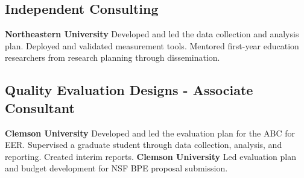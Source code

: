 
\subsection{Independent Consulting}
\begin{cvtable}
        {\color{cvsectioncolor}{Entrepreneurial Mindset and Cultural Wealth in Engineering \\(EM-FYE)}}
        {\textbf{Northeastern University}}
        {Developed and led the data collection and analysis plan. Deployed and validated measurement tools. Mentored first-year education researchers from research planning through dissemination.}
\end{cvtable}

\subsection{Quality Evaluation Designs - Associate Consultant}
\begin{cvtable}
        {\color{cvsectioncolor}{Advocacy Building Campaign for Engineering Education Research \\(ABC for EER)}}
        {\textbf{Clemson University}}
        {Developed and led the evaluation plan for the ABC for EER. Supervised a graduate student through data collection, analysis, and reporting. Created interim reports.}
        {\color{cvsectioncolor}{Peer Review as an Inclusive Mentoring Experience \\(PRIME)}}
        {\textbf{Clemson University}}
        {Led evaluation plan and budget development for NSF BPE proposal submission.}
\end{cvtable}

